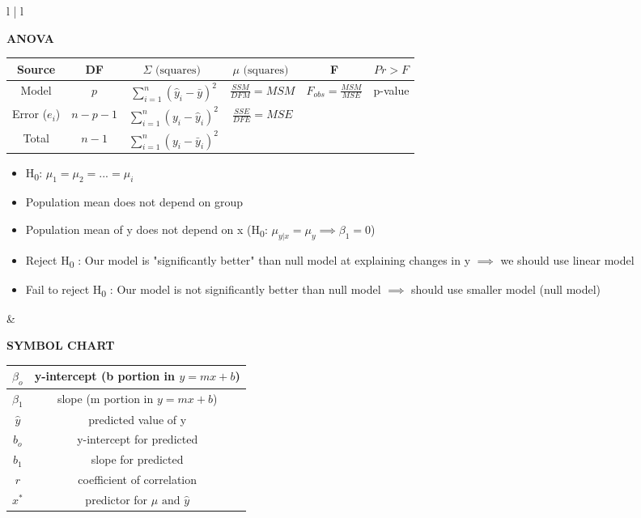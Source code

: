 \documentclass[6pt]{article}
\begin{document}
\begin{footnotesize}
\begin{tabular}{l | l}
{\begin{flushleft}
\textbf{ANOVA}
\end{flushleft}
\begin{flushleft}
 \begin{tabular}{||c | c | c | c | c | c ||} 
 \hline
 Source & DF & $\Sigma \text{ (squares) }$ & $\mu \text{ (squares) }$ & F & $Pr > F$ \\
 \hline
 Model & $p$ & $\sum_{i=1}^{n}(\hat{y}_{i} - \bar{y})^{2}$ & $\frac{SSM}{DFM} = MSM$ & $F_{obs} = \frac{MSM}{MSE}$ & p-value \\ [0.5em]
 \hline
 Error ($e_{i}$) & $n-p-1$ & $\sum_{i=1}^{n}(y_{i} - \hat{y}_{i})^{2}$ & $\frac{SSE}{DFE} = MSE$ &  & \\
 \hline
 Total & $n-1$ & $\sum_{i=1}^{n}(y_{i} - \bar{y}_{i})^{2}$ & & & \\
 \hline
\end{tabular}
\begin{itemize}
\item H\textsubscript{0}: $\mu_{1} = \mu_{2} = ... = \mu_{i}$
\item Population mean does not depend on group
\item Population mean of y does not depend on x (H\textsubscript{0}: $\mu_{y|x} = \mu_{y} \implies \beta_{1} = 0$)
\item Reject H\textsubscript{0} : Our model is "significantly better" than null model at explaining changes in y $\implies$ we should use linear model
\item Fail to reject H\textsubscript{0} : Our model is not significantly better than null model $\implies$ should use smaller model (null model)
\end{itemize}
\end{flushleft}
}

&

\parbox{0.5\textwidth}{
\begin{flushleft}
\textbf{SYMBOL CHART}
\end{flushleft}
\begin{flushleft}
 \begin{tabular}{||c | c ||} 
 \hline
 $\beta_{o}$ & y-intercept (b portion in $y=mx+b$) \\
 \hline
 $\beta_{1}$ & slope (m portion in $y=mx+b$) \\ [0.5ex]
 \hline
 $\hat{y}$ & predicted value of y \\
 \hline
 $b_{o}$ & y-intercept for predicted \\
 \hline
 $b_{1}$ & slope for predicted \\
 \hline
 $r$ & coefficient of correlation \\
 \hline
 $x^{\ast}$ & predictor for $\hat{\mu} \text{ and } \hat{y}$ \\
 \hline
\end{tabular}
\end{flushleft}
}
\end{tabular}


\end{footnotesize}
\end{document}
